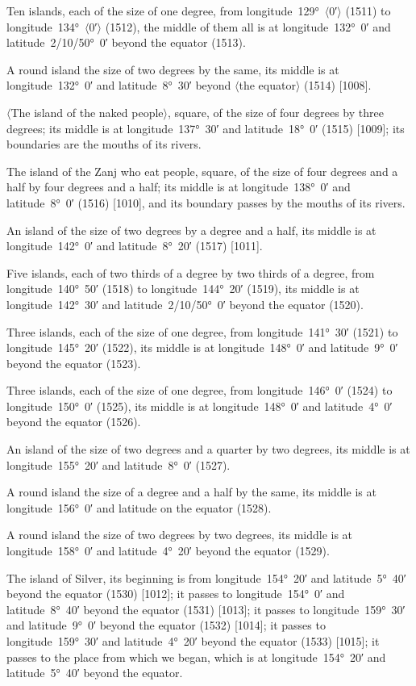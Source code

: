 \documentclass[11pt]{article}
\newcommand{\Pg}[1]{\marginpar{\footnotesize #1}}
\newcommand{\Ang}[1]{\ensuremath{#1}}
\begin{document}
Ten islands, each of the size of one degree, from longitude~129°~\Ang{\langle}0′\Ang{\rangle} (1511) to longitude~134°~\Ang{\langle}0′\Ang{\rangle} (1512)\Pg{p. 99}, the middle of them all is at longitude~132°~0′ and latitude~2/10/50°~0′ beyond the equator (1513).

A round island the size of two degrees by the same, its middle is at longitude~132°~0′ and latitude~8°~30′ beyond \Ang{\langle}the equator\Ang{\rangle} (1514) [1008].

\Ang{\langle}The island of the naked people\Ang{\rangle}, square, of the size of four degrees by three degrees; its middle is at longitude~137°~30′ and latitude~18°~0′ (1515) [1009]; its boundaries are the mouths of its rivers.

The island of the Zanj who eat people, square, of the size of four degrees and a half by four degrees and a half; its middle is at longitude~138°~0′ and latitude~8°~0′ (1516) [1010], and its boundary passes by the mouths of its rivers.

An island of the size of two degrees by a degree and a half, its middle is at longitude~142°~0′ and latitude~8°~20′ (1517) [1011].

Five islands, each of two thirds of a degree by two thirds of a degree, from longitude~140°~50′ (1518) to longitude~144°~20′ (1519), its middle is at longitude~142°~30′ and latitude~2/10/50°~0′ beyond the equator (1520).

Three islands, each of the size of one degree, from longitude~141°~30′ (1521) to longitude~145°~20′ (1522), its middle is at longitude~148°~0′ and latitude~9°~0′ beyond the equator (1523).

Three islands, each of the size of one degree, from longitude~146°~0′ (1524) to longitude~150°~0′ (1525), its middle is at longitude~148°~0′ and latitude~4°~0′ beyond the equator (1526).

An island of the size of two degrees and a quarter by two degrees, its middle is at longitude~155°~20′ and latitude~8°~0′ (1527).

A round island the size of a degree and a half by the same, its middle is at longitude~156°~0′ and latitude on the equator (1528).

A round island the size of two degrees by two degrees, its middle is at longitude~158°~0′ and latitude~4°~20′ beyond the equator (1529)\Pg{p. 100}.

The island of Silver, its beginning is from longitude~154°~20′ and latitude~5°~40′ beyond the equator (1530) [1012]; it passes to longitude~154°~0′ and latitude~8°~40′ beyond the equator (1531) [1013]; it passes to longitude~159°~30′ and latitude~9°~0′ beyond the equator (1532) [1014]; it passes to longitude~159°~30′ and latitude~4°~20′ beyond the equator (1533) [1015]; it passes to the place from which we began, which is at longitude~154°~20′ and latitude~5°~40′ beyond the equator.
\end{document}
